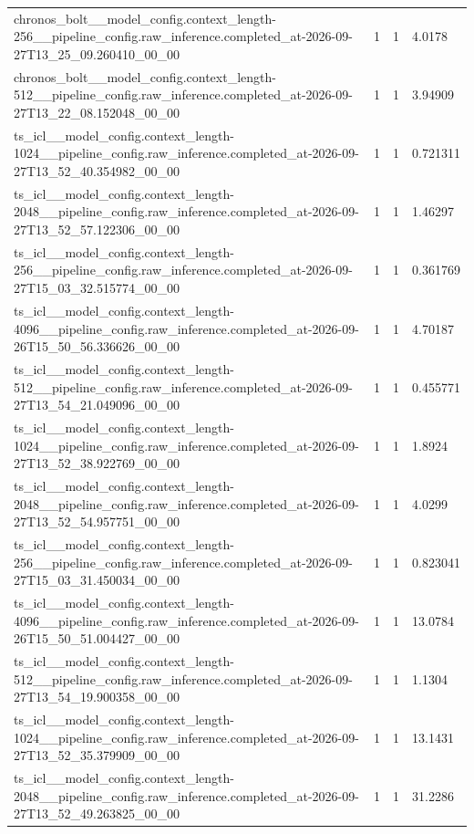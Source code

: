 \begin{tabular}{llll}
chronos\_bolt\_\_model\_config.context\_length-256\_\_pipeline\_config.raw\_inference.completed\_at-2026-09-27T13\_25\_09.260410\_00\_00 & 1 & 1 & 4.0178 \\
chronos\_bolt\_\_model\_config.context\_length-512\_\_pipeline\_config.raw\_inference.completed\_at-2026-09-27T13\_22\_08.152048\_00\_00 & 1 & 1 & 3.94909 \\
ts\_icl\_\_model\_config.context\_length-1024\_\_pipeline\_config.raw\_inference.completed\_at-2026-09-27T13\_52\_40.354982\_00\_00 & 1 & 1 & 0.721311 \\
ts\_icl\_\_model\_config.context\_length-2048\_\_pipeline\_config.raw\_inference.completed\_at-2026-09-27T13\_52\_57.122306\_00\_00 & 1 & 1 & 1.46297 \\
ts\_icl\_\_model\_config.context\_length-256\_\_pipeline\_config.raw\_inference.completed\_at-2026-09-27T15\_03\_32.515774\_00\_00 & 1 & 1 & 0.361769 \\
ts\_icl\_\_model\_config.context\_length-4096\_\_pipeline\_config.raw\_inference.completed\_at-2026-09-26T15\_50\_56.336626\_00\_00 & 1 & 1 & 4.70187 \\
ts\_icl\_\_model\_config.context\_length-512\_\_pipeline\_config.raw\_inference.completed\_at-2026-09-27T13\_54\_21.049096\_00\_00 & 1 & 1 & 0.455771 \\
ts\_icl\_\_model\_config.context\_length-1024\_\_pipeline\_config.raw\_inference.completed\_at-2026-09-27T13\_52\_38.922769\_00\_00 & 1 & 1 & 1.8924 \\
ts\_icl\_\_model\_config.context\_length-2048\_\_pipeline\_config.raw\_inference.completed\_at-2026-09-27T13\_52\_54.957751\_00\_00 & 1 & 1 & 4.0299 \\
ts\_icl\_\_model\_config.context\_length-256\_\_pipeline\_config.raw\_inference.completed\_at-2026-09-27T15\_03\_31.450034\_00\_00 & 1 & 1 & 0.823041 \\
ts\_icl\_\_model\_config.context\_length-4096\_\_pipeline\_config.raw\_inference.completed\_at-2026-09-26T15\_50\_51.004427\_00\_00 & 1 & 1 & 13.0784 \\
ts\_icl\_\_model\_config.context\_length-512\_\_pipeline\_config.raw\_inference.completed\_at-2026-09-27T13\_54\_19.900358\_00\_00 & 1 & 1 & 1.1304 \\
ts\_icl\_\_model\_config.context\_length-1024\_\_pipeline\_config.raw\_inference.completed\_at-2026-09-27T13\_52\_35.379909\_00\_00 & 1 & 1 & 13.1431 \\
ts\_icl\_\_model\_config.context\_length-2048\_\_pipeline\_config.raw\_inference.completed\_at-2026-09-27T13\_52\_49.263825\_00\_00 & 1 & 1 & 31.2286 \\

\end{tabular}
